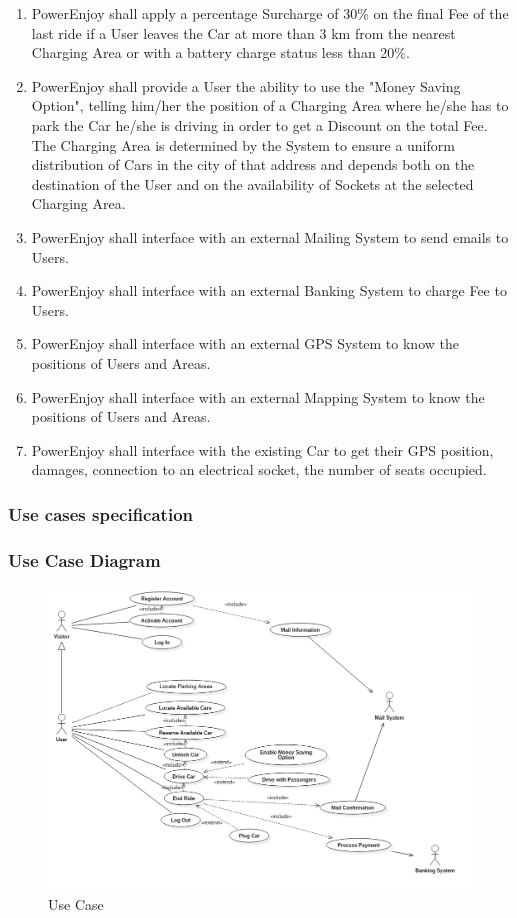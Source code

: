 \begin{enumerate}[label=\textbf{R\arabic*}]
\item PowerEnjoy shall apply a percentage Surcharge of 30\% on the final Fee of the last ride if a User leaves the Car at more than 3 km from the nearest Charging Area or with a battery charge status less than 20\%.
\item PowerEnjoy shall provide a User the ability to use the "Money Saving Option", telling him/her the position of a Charging Area where he/she has to park the Car he/she is driving in order to get a Discount on the total Fee. The Charging Area is determined by the System to ensure a uniform distribution of Cars in the city of that address and depends both on the destination of the User and on the availability of Sockets at the selected Charging Area.
\item PowerEnjoy shall interface with an external Mailing System to send emails to Users.
\item PowerEnjoy shall interface with an external Banking System to charge Fee to Users.
\item PowerEnjoy shall interface with an external GPS System to know the positions of Users and Areas.
\item PowerEnjoy shall interface with an external Mapping System to know the positions of Users and Areas.
\item PowerEnjoy shall interface with the existing Car to get their GPS position, damages, connection to an electrical socket, the number of seats occupied. 
\end{enumerate}

\subsubsection{Use cases specification}


\subsubsection{Use Case Diagram}
\begin{figure}[h]
\centering
\includegraphics[width=\linewidth,keepaspectratio]{../Diagrams/UC/Use_Case.png}
\caption{Use Case}
\end{figure}
\FloatBarrier
\clearpage

